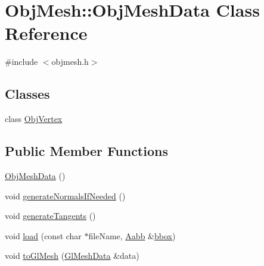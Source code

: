 \hypertarget{class_obj_mesh_1_1_obj_mesh_data}{}\section{Obj\+Mesh\+::Obj\+Mesh\+Data Class Reference}
\label{class_obj_mesh_1_1_obj_mesh_data}


{\ttfamily \#include $<$objmesh.\+h$>$}

\subsection*{Classes}
\begin{DoxyCompactItemize}
\item 
class \mbox{\hyperlink{class_obj_mesh_1_1_obj_mesh_data_1_1_obj_vertex}{Obj\+Vertex}}
\end{DoxyCompactItemize}
\subsection*{Public Member Functions}
\begin{DoxyCompactItemize}
\item 
\mbox{\hyperlink{class_obj_mesh_1_1_obj_mesh_data_a60cd7ccf455f36bc44e50be50f036fe7}{Obj\+Mesh\+Data}} ()
\item 
void \mbox{\hyperlink{class_obj_mesh_1_1_obj_mesh_data_a0a43c495dbb859e42a5d9331835f0e23}{generate\+Normals\+If\+Needed}} ()
\item 
void \mbox{\hyperlink{class_obj_mesh_1_1_obj_mesh_data_ae264e93b60d2d0b898754b026de38d94}{generate\+Tangents}} ()
\item 
void \mbox{\hyperlink{class_obj_mesh_1_1_obj_mesh_data_aafd7954d3e645958b1a533f1e875c2f6}{load}} (const char $\ast$file\+Name, \mbox{\hyperlink{class_aabb}{Aabb}} \&\mbox{\hyperlink{class_obj_mesh_a21ce3155628d670cec7b107959a6788b}{bbox}})
\item 
void \mbox{\hyperlink{class_obj_mesh_1_1_obj_mesh_data_ab6688d87c9cee459d1b1c0813fa360ef}{to\+Gl\+Mesh}} (\mbox{\hyperlink{class_obj_mesh_1_1_gl_mesh_data}{Gl\+Mesh\+Data}} \&data)
\end{DoxyCompactItemize}
